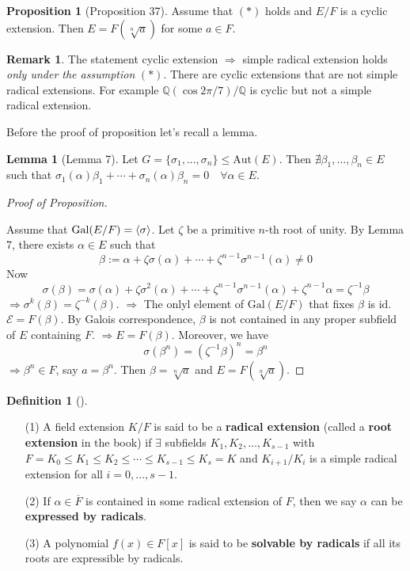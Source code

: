 \documentclass{article}
\theoremstyle{definition}
\newtheorem{lem}{Lemma}
\newtheorem{dfn}{Definition}
\newtheorem{rem}{Remark}
\newtheorem{prop}{Proposition}
\newenvironment{proofs}[1][\proofname]{%
  \begin{proof}[#1]$ $\par\nobreak\ignorespaces
}{%
  \end{proof}
}
\newenvironment{dfns}[1][]{%
  \begin{dfn}[#1]$ $\par\nobreak\ignorespaces
}{%
  \end{dfn}
}
\newcommand{\E}{\mathcal E}
\newcommand{\QQ}{\mathbb Q}
\newcommand{\Ra}{\Rightarrow}
\newcommand{\Gal}{\text{Gal}}
\newcommand{\id}{\text{id}}
\begin{document}
\begin{prop}[Proposition 37]
	Assume that $(*)$ holds and $E/F$ is a cyclic extension.
	Then $E = F(\sqrt[n]{a})$ for some $a \in F$.
\end{prop}

\begin{rem}
	The statement cyclic extension $\Ra$ simple radical extension holds \textit{only under the assumption} $(*)$.
	There are cyclic extensions that are not simple radical extensions.
	For example $\QQ(\cos 2 \pi/7)/\QQ$ is cyclic but not a simple radical extension.
\end{rem}

Before the proof of proposition let's recall a lemma.

\begin{lem}[Lemma 7]
	Let $G = \{\sigma_1, ..., \sigma_n\} \leq \text{Aut}(E)$.
	Then $\nexists \beta_1, ..., \beta_n \in E$ such that $\sigma_1(\alpha) \beta_1 + \cdots + \sigma_n(\alpha) \beta_n = 0 \quad \forall \alpha \in E$.
\end{lem}

\begin{proofs}[Proof of Proposition]
	Assume that $\Gal(E/F) = \ev{\sigma}$.
	Let $\zeta$ be a primitive $n$-th root of unity.
	By Lemma 7, there exists $\alpha \in E$ such that
	\[
		\beta := \alpha + \zeta \sigma(\alpha) + \cdots + \zeta^{n -1} \sigma^{n - 1} (\alpha) \neq 0
	\]
	Now 
	\[
		\sigma(\beta) = \sigma(\alpha) + \zeta \sigma^2 (\alpha) + \cdots + \zeta^{n - 1} \sigma^{n - 1} (\alpha) + \zeta^{n - 1} \alpha = \zeta^{-1} \beta
	\]
	$\Ra \sigma^k(\beta) = \zeta^{-k}(\beta)$.
	$\Ra$ The onlyl element of $\Gal(E/F)$ that fixes $\beta$ is $\id$.
	$\E = F(\beta)$.
	By Galois correspondence, $\beta$ is not contained in any proper subfield of $E$ containing $F$.
	$\Ra E = F(\beta)$.
	Moreover, we have
	\[
		\sigma(\beta^n) = (\zeta^{-1} \beta)^n = \beta^n
	\]
	$\Ra \beta^n \in F$, say $a = \beta^n$.
	Then $\beta = \sqrt[n]{a}$ and $E = F(\sqrt[n]{a})$.
\end{proofs}

\begin{dfns}
	\begin{enumerate}
		\item[(1)] A field extension $K/F$ is said to be a \textbf{radical extension} (called a \textbf{root extension} in the book) if $\exists$ subfields $K_1, K_2, ..., K_{s - 1}$ with $F = K_0 \leq K_1 \leq K_2 \leq \cdots \leq K_{s - 1} \leq K_s = K$ and $K_{i + 1}/K_i$ is a simple radical extension for all $i = 0, ..., s - 1$.

		\item[(2)] If $\alpha \in \overline{F}$ is contained in some radical extension of $F$, then we say $\alpha$ can be \textbf{expressed by radicals}.

		\item[(3)] A polynomial $f(x) \in F[x]$ is said to be \textbf{solvable by radicals} if all its roots are expressible by radicals.
	\end{enumerate}
\end{dfns}
\end{document}
